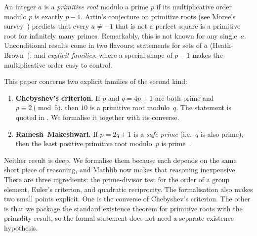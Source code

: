 \documentclass[11pt]{article}
\theoremstyle{remark}
\begin{document}
An integer $a$ is a \emph{primitive root} modulo a prime $p$ if its multiplicative order modulo
$p$ is exactly $p-1$. Artin's conjecture on primitive roots (see Moree's survey~\cite{Moree}) predicts
that every $a\neq -1$ that is not a perfect square is a primitive root for infinitely many
primes. Remarkably, this is not known for any single~$a$. Unconditional results come in two
flavours: statements for sets of $a$ (Heath-Brown~\cite{HeathBrown}), and \emph{explicit
families}, where a special shape of $p-1$ makes the multiplicative order easy to control.

This paper concerns two explicit families of the second kind:
\begin{enumerate}
\item \textbf{Chebyshev's criterion.} If $p$ and $q=4p+1$ are both prime and $p\equiv 2\pmod 5$,
then $10$ is a primitive root modulo~$q$. The statement is quoted in \cite[\S1]{Moree}. We
formalise it together with its converse.
\item \textbf{Ramesh--Makeshwari.} If $p=2q+1$ is a \emph{safe prime} (i.e.\ $q$ is also prime),
then the least positive primitive root modulo~$p$ is prime~\cite{RM}.
\end{enumerate}

Neither result is deep. We formalise them because each depends on the same short
piece of reasoning, and Mathlib now makes that reasoning inexpensive. There are three ingredients:
the prime-divisor test for the order of a group element, Euler's criterion, and quadratic reciprocity.
The formalisation also makes two small points explicit. One is the converse of Chebyshev's
criterion. The other is that we package the standard existence theorem for primitive roots with
the primality result, so the formal statement does not need a separate existence hypothesis.
\end{document}

